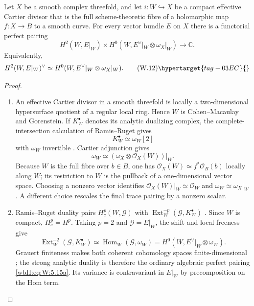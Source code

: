 \begin{proposition}
\hypertarget{tag-03IJ}{}\label{wbII:prop:cartier-duality-absolute}

Let $X$ be a smooth complex threefold,
and let $i:W\hookrightarrow X$ be a compact effective Cartier divisor that
is the full scheme-theoretic fibre of a holomorphic map $f:X\to B$ to a
smooth curve.  For every vector bundle $E$ on $X$ there is a functorial
perfect pairing
\[
 H^2(W,E|_W)\times
 H^0(W,E^\vee|_W\otimes\omega_X|_W)\longrightarrow\mathbb C.
\]
Equivalently,
\[
 H^2(W,E|_W)^\vee\simeq
 H^0(W,E^\vee|_W\otimes\omega_X|_W).
\tag{W.12}\hypertarget{tag-03EC}{}\label{wbII:eq:W:5.15a}
\]
\end{proposition}



\begin{proof}

\begin{enumerate}[label=\arabic*.,leftmargin=*]
\item An effective Cartier divisor in a smooth threefold is locally a
two-dimensional hypersurface quotient of a regular local ring.  Hence $W$
is Cohen--Macaulay and Gorenstein.  If $K_W^\bullet$ denotes its analytic
dualizing complex, the complete-intersection calculation of Ramis--Ruget
gives
\[
 K_W^\bullet\simeq\omega_W[2]
\]
with $\omega_W$ invertible
\cite[Proposition~2 and the complete-intersection calculation,
pp.~90--91]{RR70push}.  Cartier adjunction gives
\[
 \omega_W\simeq
 (\omega_X\otimes\mathcal O_X(W))|_W.
\]
Because $W$ is the full fibre over $b\in B$, one has
$\mathcal O_X(W)\simeq f^*\mathcal O_B(b)$ locally along $W$; its
restriction to $W$ is the pullback of a one-dimensional vector space.
Choosing a nonzero vector identifies
$\mathcal O_X(W)|_W\simeq\mathcal O_W$ and
$\omega_W\simeq\omega_X|_W$.  A different choice rescales the final trace
pairing by a nonzero scalar.

\item Ramis--Ruget duality pairs $H_c^p(W,\mathcal G)$ with
$\operatorname{Ext}^{-p}_W(\mathcal G,K_W^\bullet)$
\cite[Theorem~2, pp.~82--83]{RR70push}.  Since $W$ is compact,
$H_c^p=H^p$.  Taking $p=2$ and $\mathcal G=E|_W$, the shift and local
freeness give
\[
 \operatorname{Ext}^{-2}_W(\mathcal G,K_W^\bullet)
 \simeq\operatorname{Hom}_W(\mathcal G,\omega_W)
 =H^0(W,E^\vee|_W\otimes\omega_W).
\]
Grauert finiteness makes both coherent cohomology spaces finite-dimensional
\cite{Grauert1960D}; the strong analytic duality is therefore the ordinary
algebraic perfect pairing \eqref{wbII:eq:W:5.15a}.  Its variance is contravariant in $E|_W$
by precomposition on the Hom term.

\end{enumerate}
\end{proof}